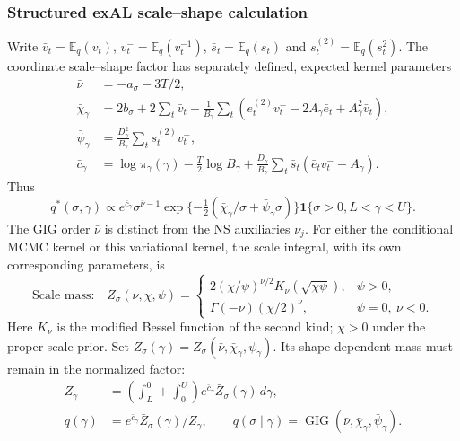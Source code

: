 \documentclass[12pt,letterpaper]{article}
\newcommand{\E}{\mathbb{E}}
\newcommand{\ind}{\mathbf{1}}
\newcommand{\GIG}{\operatorname{GIG}}
\numberwithin{suppalgorithm}{section}
\numberwithin{equation}{section}
\numberwithin{table}{section}
\numberwithin{figure}{section}
\begin{document}
\subsubsection{Structured exAL scale--shape calculation}
\label{subsec:supp_structured_exal_vb}

Write \(\bar v_t=\E_q(v_t)\), \(v_t^-=\E_q(v_t^{-1})\),
\(\bar s_t=\E_q(s_t)\) and \(s_t^{(2)}=\E_q(s_t^2)\). The coordinate
scale--shape factor has separately defined, expected kernel parameters
\begin{equation}
\begin{aligned}
\bar\nu&=-a_\sigma-3T/2,\\
\bar\chi_\gamma&=2b_\sigma+2\sum_t\bar v_t+
 \frac1{B_\gamma}\sum_t
 (e_t^{(2)}v_t^- -2A_\gamma\bar e_t+A_\gamma^2\bar v_t),\\
\bar\psi_\gamma&=\frac{D_\gamma^2}{B_\gamma}
 \sum_t s_t^{(2)}v_t^-,\\
\bar c_\gamma&=\log\pi_\gamma(\gamma)-\tfrac T2\log B_\gamma+
 \frac{D_\gamma}{B_\gamma}
 \sum_t\bar s_t(\bar e_tv_t^- -A_\gamma).
\end{aligned}
\label{eq:supp_structured_scale_shape_terms}
\end{equation}
Thus
\begin{equation}
q^*(\sigma,\gamma)\propto
 e^{\bar c_\gamma}\sigma^{\bar\nu-1}
 \exp\{-\tfrac12(\bar\chi_\gamma/\sigma+
 \bar\psi_\gamma\sigma)\}\ind\{\sigma>0,L<\gamma<U\}.
\label{eq:supp_structured_scale_shape_kernel}
\end{equation}
The GIG order \(\bar\nu\) is distinct from the NS auxiliaries \(\nu_j\).
For either the conditional MCMC kernel or this variational kernel, the
scale integral, with its own corresponding parameters, is
\begin{equation}
\text{Scale mass:}\quad
Z_\sigma(\nu,\chi,\psi)=
\begin{cases}
2(\chi/\psi)^{\nu/2}K_\nu(\sqrt{\chi\psi}),&\psi>0,\\
\Gamma(-\nu)(\chi/2)^\nu,&\psi=0,\ \nu<0.
\end{cases}
\label{eq:supp_structured_scale_integral}
\end{equation}
Here \(K_\nu\) is the modified Bessel function of the second kind;
\(\chi>0\) under the proper scale prior. Set
\(\bar Z_\sigma(\gamma)=
Z_\sigma(\bar\nu,\bar\chi_\gamma,\bar\psi_\gamma)\). Its
shape-dependent mass must remain in the normalized factor:
\begin{equation}
\begin{aligned}
Z_\gamma&=\left(\int_L^0+\int_0^U\right)
 e^{\bar c_\gamma}\bar Z_\sigma(\gamma)\,d\gamma,\\
q(\gamma)&=e^{\bar c_\gamma}\bar Z_\sigma(\gamma)/Z_\gamma,\qquad
q(\sigma\mid\gamma)=\GIG(\bar\nu,\bar\chi_\gamma,\bar\psi_\gamma).
\end{aligned}
\label{eq:supp_structured_shape_factor}
\end{equation}
\end{document}
